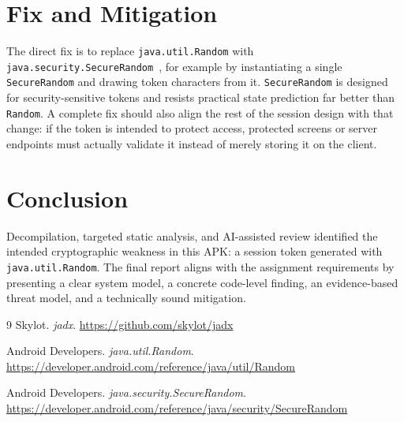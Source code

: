 \documentclass[letterpaper,twocolumn,10pt]{article}
\begin{document}
\section{Fix and Mitigation}
The direct fix is to replace \texttt{java.util.Random} with \texttt{java.security.SecureRandom}~\cite{securedoc}, for example by instantiating a single \texttt{SecureRandom} and drawing token characters from it. \texttt{SecureRandom} is designed for security-sensitive tokens and resists practical state prediction far better than \texttt{Random}. A complete fix should also align the rest of the session design with that change: if the token is intended to protect access, protected screens or server endpoints must actually validate it instead of merely storing it on the client.

\section{Conclusion}
Decompilation, targeted static analysis, and AI-assisted review identified the intended cryptographic weakness in this APK: a session token generated with \texttt{java.util.Random}. The final report aligns with the assignment requirements by presenting a clear system model, a concrete code-level finding, an evidence-based threat model, and a technically sound mitigation.

\begin{thebibliography}{9}
\small
{}
Skylot. \textit{jadx}. \url{https://github.com/skylot/jadx}

Android Developers. \textit{java.util.Random}. \url{https://developer.android.com/reference/java/util/Random}

Android Developers. \textit{java.security.SecureRandom}. \url{https://developer.android.com/reference/java/security/SecureRandom}
\end{thebibliography}
\end{document}
